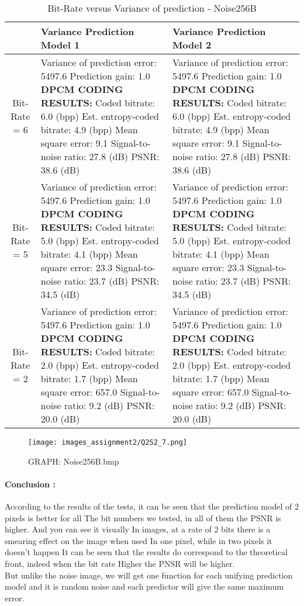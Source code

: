 \documentclass[letterpaper, 12pt]{article}
\begin{document}
\begin{table}[htbp]
    \centering
    \begin{tabular}{|c|p{6cm}|p{6cm}|}
        \hline
         & \textbf{Variance Prediction Model 1} & \textbf{Variance Prediction Model 2} \\
        \hline
         Bit-Rate = 6 & Variance of prediction error: 5497.6 Prediction gain: 1.0 \textbf{DPCM CODING RESULTS:} Coded bitrate: 6.0 (bpp) Est. entropy-coded bitrate: 4.9 (bpp) Mean square error: 9.1 Signal-to-noise ratio: 27.8 (dB) PSNR: 38.6 (dB) & Variance of prediction error: 5497.6 Prediction gain: 1.0 \textbf{DPCM CODING RESULTS:} Coded bitrate: 6.0 (bpp) Est. entropy-coded bitrate: 4.9 (bpp) Mean square error: 9.1 Signal-to-noise ratio: 27.8 (dB) PSNR: 38.6 (dB) \\
        \hline
         Bit-Rate = 5 & Variance of prediction error: 5497.6 Prediction gain: 1.0 \textbf{DPCM CODING RESULTS:} Coded bitrate: 5.0 (bpp) Est. entropy-coded bitrate: 4.1 (bpp) Mean square error: 23.3 Signal-to-noise ratio: 23.7 (dB) PSNR: 34.5 (dB) & Variance of prediction error: 5497.6 Prediction gain: 1.0 \textbf{DPCM CODING RESULTS:} Coded bitrate: 5.0 (bpp) Est. entropy-coded bitrate: 4.1 (bpp) Mean square error: 23.3 Signal-to-noise ratio: 23.7 (dB) PSNR: 34.5 (dB) \\
        \hline
         Bit-Rate = 2 & Variance of prediction error: 5497.6 Prediction gain: 1.0 \textbf{DPCM CODING RESULTS:} Coded bitrate: 2.0 (bpp) Est. entropy-coded bitrate: 1.7 (bpp) Mean square error: 657.0 Signal-to-noise ratio: 9.2 (dB) PSNR: 20.0 (dB) & Variance of prediction error: 5497.6 Prediction gain: 1.0 \textbf{DPCM CODING RESULTS:} Coded bitrate: 2.0 (bpp) Est. entropy-coded bitrate: 1.7 (bpp) Mean square error: 657.0 Signal-to-noise ratio: 9.2 (dB) PSNR: 20.0 (dB) \\
        \hline
    \end{tabular}
    \caption{Bit-Rate versus Variance of prediction - Noise256B}
    \label{tab:my_label}
\end{table}



\begin{figure}[htbp]
    \centering
    \texttt{[image: images\_assignment2/Q2S2\_7.png]}
    \caption{GRAPH: Noise256B.bmp}
\end{figure}
\paragraph{Conclusion :} According to the results of the tests, it can be seen that the prediction model of 2 pixels is better for all The bit numbers we tested, in all of them the PSNR is higher. And you can see it visually In images, at a rate of 2 bits there is a smearing effect on the image when used
In one pixel, while in two pixels it doesn't happen It can be seen that the results do correspond to the theoretical front, indeed when the bit rate Higher the PNSR will be higher. \\
But unlike the noise image, we will get one function for each unifying prediction model and it is random noise and each predictor will give the same maximum error.
\newpage
\end{document}
